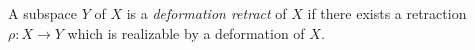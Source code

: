 A subspace $Y$ of $X$ is a \textit{deformation retract} of $X$ if there exists a retraction $\rho: X \to Y$ which is realizable by a deformation of $X$.
